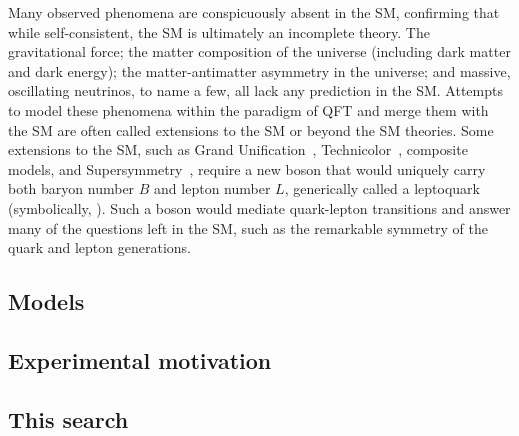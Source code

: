 Many observed phenomena are conspicuously absent in the SM, confirming that while self-consistent, the SM is ultimately an incomplete theory. The gravitational force; the matter composition of the universe (including dark matter and dark energy); the matter-antimatter asymmetry in the universe; and massive, oscillating neutrinos, to name a few, all lack any prediction in the SM. Attempts to model these phenomena within the paradigm of QFT and merge them with the SM are often called extensions to the SM or beyond the SM theories. Some extensions to the SM, such as Grand Unification~\cite{gut1}\cite{gut2}, Technicolor~\cite{techni1}\cite{techni2}\cite{techni3}, composite models, and Supersymmetry~\cite{superstring}, require a new boson that would uniquely carry both baryon number $B$ and lepton number $L$, generically called a leptoquark (symbolically, \LQ). Such a boson would mediate quark-lepton transitions and answer many of the questions left in the SM, such as the remarkable symmetry of the quark and lepton generations.

\subsection{Models} \label{sec:LQModels}


\subsection{Experimental motivation} \label{sec:ExperimentalMotivation}


\subsection{This search} \label{sec:ThisSearch}

